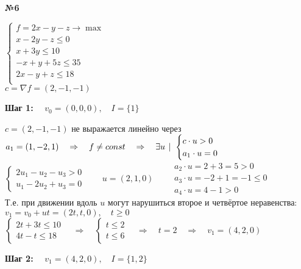 \documentclass{article}
\newenvironment{task}{\begin{center}\fontsize{14}{14}\selectfont\bf}{\rm\fontsize{12}{12}\selectfont\end{center}}
\newcommand{\tch}{\hspace{4px}|\hspace{4px}}
\newcommand{\rimpl}{\quad \Rightarrow \quad}
\begin{document}
	\begin{task} 
		№6
	\end{task}
	\begin{center}
			$\begin{cases}
			f = 2x-y-z \rightarrow\max \\
			x-2y-z \leq 0 \\
			x+3y \leq 10 \\
			-x+y+5z \leq 35 \\
			2x-y+z \leq 18 \\
			\end{cases}$\\
			\vspace{4px}
			$c = \nabla f = (2, -1, -1)$
	\end{center}
	\textbf{Шаг 1:} $\quad v_0 = (0, 0, 0),\quad I = \lbrace1\rbrace$\\
	\begin{center}
	$c = (2, -1, -1)$ не выражается линейно через $a_1 = (1, -2, 1) \rimpl f \not= const \rimpl \exists u \tch \begin{cases}
	c\cdot u > 0 \\ a_1\cdot u = 0
	\end{cases}$ \\
	$\begin{cases}
		2u_1 - u_2 - u_3 > 0 \\ u_1 -2u_2 + u_3 = 0
	\end{cases} \qquad u = (2, 1, 0) \qquad \begin{array}{l}
	a_2\cdot u = 2 + 3 = 5 > 0 \\
	a_3\cdot u = -2 + 1 = -1 \leq 0 \\
	a_4\cdot u = 4 - 1 > 0
	\end{array}$ \\
	Т.е. при движении вдоль $u$ могут нарушиться второе и четвёртое неравенства:\\
	$v_1 = v_0 + ut = (2t, t, 0), \quad t \geq 0$\\
	$\begin{cases}
	2t + 3t \leq 10 \\
	4t - t \leq 18
	\end{cases} \rimpl \begin{cases}
		t \leq 2 \\
		t \leq 6
	\end{cases} \rimpl t = 2 \rimpl v_1 = (4, 2, 0)$
	\end{center}
	\textbf{Шаг 2:} $\quad v_1 = (4, 2, 0),\quad I = \lbrace1, 2\rbrace$
\end{document}
